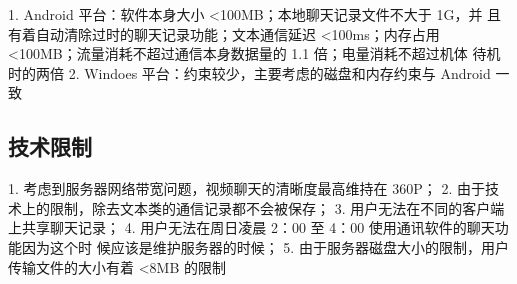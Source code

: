 1. Android 平台：软件本身大小 <100MB；本地聊天记录文件不大于 1G，并
且有着自动清除过时的聊天记录功能；文本通信延迟 <100ms；内存占用
<100MB；流量消耗不超过通信本身数据量的 1.1 倍；电量消耗不超过机体
待机时的两倍
2. Windoes 平台：约束较少，主要考虑的磁盘和内存约束与 Android 一致

\subsection{技术限制}
1. 考虑到服务器网络带宽问题，视频聊天的清晰度最高维持在 360P；
2. 由于技术上的限制，除去文本类的通信记录都不会被保存；
3. 用户无法在不同的客户端上共享聊天记录；
4. 用户无法在周日凌晨 2：00 至 4：00 使用通讯软件的聊天功能因为这个时
候应该是维护服务器的时候；
5. 由于服务器磁盘大小的限制，用户传输文件的大小有着 <8MB 的限制
